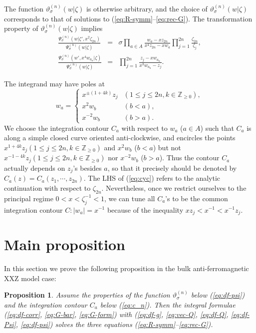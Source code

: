 \documentclass[a4paper,10pt]{article}
\newtheorem{prop}[thm]{Proposition}
\begin{document}
The function $\vartheta_{\sigma}^{(n)}(w|\zeta )$
is otherwise arbitrary, and the choice of 
$\vartheta_{\sigma}^{(n)}(w|\zeta )$ 
corresponds to that of solutions to 
(\ref{eq:R-symm}--\ref{eq:rec-G}). 
The transformation property of 
$\vartheta_{\sigma}^{(n)}(w|\zeta )$ implies
\begin{eqnarray}
\frac{\Psi_{\sigma}^{(n)}(w|\zeta', x^2 \zeta_{2n})}
{\Psi_{\sigma}^{(n)}(w|\zeta )}
&=&\sigma\prod_{a\in A}\frac{w_a-xz_{2n}}{x^4 z_{2n}-xw_a}
\prod_{j=1}^{2n} \frac{\zeta_{2n}}{\zeta_j}, 
\label{eq:trPsi1} \\
\frac{\Psi_{\sigma}^{(n)}(w',x^4 w_{a_n}|\zeta )}
{\Psi_{\sigma}^{(n)}(w|\zeta )}
&=&\prod_{j=1}^{2n}\frac{z_j -xw_{a_n}}{x^3 w_{a_n}-z_j}.
\label{eq:trPsi2}
\end{eqnarray}

The integrand may have poles at 
$$
w_a =\left\{ 
\begin{array}{ll}
x^{\pm (1+4k)}z_j & (1\leqslant j\leqslant 2n, 
k\in \mathbb{Z}_{\geqslant 0}), \\
x^2 w_b & (b<a), \\
x^{-2} w_b & (b>a). 
\end{array} \right. 
$$
We choose the integration contour $C_a$ with 
respect to $w_a$ ($a\in A$) such that $C_a$ is along 
a simple closed curve oriented anti-clockwise, and 
encircles the points $x^{1+4k}z_j 
(1\leqslant j \leqslant 2n , k\in \mathbb{Z}_{\geqslant 0})$ 
and $x^2 w_b$ ($b<a$) but not $x^{-1-4k} z_j 
(1\leqslant j \leqslant 2n, k\in \mathbb{Z}_{\geqslant 0})$ 
nor $x^{-2} w_b$ ($b>a$). Thus the contour $C_a$ actually 
depends on $z_j$'s besides $a$, so that it precisely should 
be denoted by $C_a (z)=C_a (z_1, \cdots , z_{2n})$. The LHS 
of (\ref{eq:cyc}) refers to the analytic continuation with 
respect to $\zeta_{2n}$. 
Nevertheless, once we restrict ourselves 
to the principal regime $0<x<\zeta_j^{-1}<1$, 
we can tune all $C_a$'s to be the common integration 
contour $C: |w_a|=x^{-1}$ because of the inequality 
$xz_j <x^{-1}<x^{-1}z_j$. 

\section{Main proposition}

In this section we prove the following proposition in 
the bulk anti-ferromagnetic XXZ model case: 

\begin{prop} Assume the properties of 
the function $\vartheta^{(n)}_\sigma$ 
below (\ref{eq:df-psi}) and the integration contour 
$C_a$ below (\ref{eq:c_n}). Then the integral formulae 
(\ref{eq:df-corr}, \ref{eq:G-bar}, \ref{eq:G-form}) 
with (\ref{eq:df-g}, \ref{eq:vec-Q}, \ref{eq:df-Q}, 
\ref{eq:df-Psi}, \ref{eq:df-psi}) 
solves the three equations 
(\ref{eq:R-symm}--\ref{eq:rec-G}). 
\label{prop:qKZ}
\end{prop}
\end{document}

